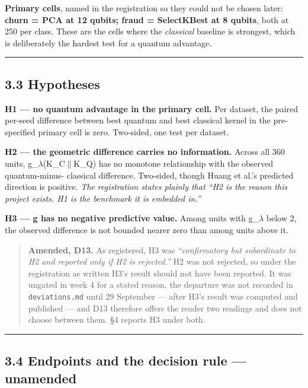 \documentclass[
  10pt,
]{article}
\begin{document}
\textbf{Primary cells}, named in the registration so they could not be
chosen later: \textbf{churn = PCA at 12 qubits; fraud = SelectKBest at 8
qubits}, both at 250 per class. These are the cells where the
\emph{classical} baseline is strongest, which is deliberately the
hardest test for a quantum advantage.

\begin{center}\rule{0.5\linewidth}{0.5pt}\end{center}

\subsection{3.3 Hypotheses}\label{hypotheses}

\textbf{H1 --- no quantum advantage in the primary cell.} Per dataset,
the paired per-seed difference between best quantum and best classical
kernel in the pre-specified primary cell is zero. Two-sided, one test
per dataset.

\textbf{H2 --- the geometric difference carries no information.} Across
all 360 units, g\_\(\lambda\)(K\_C\(\|\)K\_Q) has no monotone
relationship with the observed quantum-minus- classical difference.
Two-sided, though Huang et al.'s predicted direction is positive.
\emph{The registration states plainly that ``H2 is the reason this
project exists. H1 is the benchmark it is embedded in.''}

\textbf{H3 --- g has no negative predictive value.} Among units with
g\_\(\lambda\) below 2, the observed difference is not bounded nearer
zero than among units above it.

\begin{quote}
\textbf{Amended, D13.} As registered, H3 was \emph{``confirmatory but
subordinate to H2 and reported only if H2 is rejected.''} H2 was not
rejected, so under the registration as written H3's result should not
have been reported. It was ungated in week 4 for a stated reason, the
departure was not recorded in \texttt{deviations.md} until 29 September
--- after H3's result was computed and published --- and D13 therefore
offers the reader two readings and does not choose between them. \S{}4
reports H3 under both.
\end{quote}

\begin{center}\rule{0.5\linewidth}{0.5pt}\end{center}

\subsection{3.4 Endpoints and the decision rule ---
unamended}\label{endpoints-and-the-decision-rule-unamended}
\end{document}
